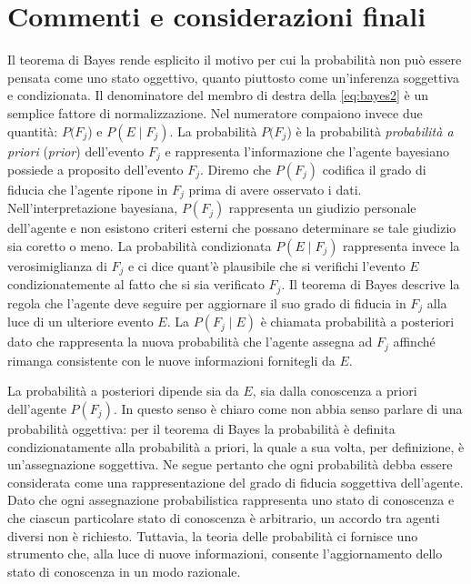 \documentclass[
  11pt,
]{krantz}
\theoremstyle{definition}
\theoremstyle{definition}
\theoremstyle{definition}
\theoremstyle{definition}
\theoremstyle{remark}
\begin{document}
\hypertarget{commenti-e-considerazioni-finali-2}{%
\section*{Commenti e considerazioni finali}\label{commenti-e-considerazioni-finali-2}}


Il teorema di Bayes rende esplicito il motivo per cui la probabilità non può essere pensata come uno stato oggettivo, quanto piuttosto come un'inferenza soggettiva e condizionata. Il denominatore del membro di destra della \eqref{eq:bayes2} è un semplice fattore di normalizzazione. Nel numeratore compaiono invece due quantità: \(P(F_j\)) e \(P(E \mid F_j)\). La probabilità \(P(F_j\)) è la probabilità \emph{probabilità a priori} (\emph{prior}) dell'evento \(F_j\) e rappresenta l'informazione che l'agente bayesiano possiede a proposito dell'evento \(F_j\). Diremo che \(P(F_j)\) codifica il grado di fiducia che l'agente ripone in \(F_j\) prima di avere osservato i dati. Nell'interpretazione bayesiana, \(P(F_j)\) rappresenta un giudizio personale dell'agente e non esistono criteri esterni che possano determinare se tale giudizio sia coretto o meno. La probabilità condizionata \(P(E \mid F_j)\) rappresenta invece la verosimiglianza di \(F_j\) e ci dice quant'è plausibile che si verifichi l'evento \(E\) condizionatemente al fatto che si sia verificato \(F_j\). Il teorema di Bayes descrive la regola che l'agente deve seguire per aggiornare il suo grado di fiducia in \(F_j\) alla luce di un ulteriore evento \(E\). La \(P(F_j \mid E)\) è chiamata probabilità a posteriori dato che rappresenta la nuova probabilità che l'agente assegna ad \(F_j\) affinché rimanga consistente con le nuove informazioni fornitegli da \(E\).

La probabilità a posteriori dipende sia da \(E\), sia dalla conoscenza a priori dell'agente \(P(F_j)\). In questo senso è chiaro come non abbia senso parlare di una probabilità oggettiva: per il teorema di Bayes la probabilità è definita condizionatamente alla probabilità a priori, la quale a sua volta, per definizione, è un'assegnazione soggettiva. Ne segue pertanto che ogni probabilità debba essere considerata come una rappresentazione del grado di fiducia soggettiva dell'agente. Dato che ogni assegnazione probabilistica rappresenta uno stato di conoscenza e che ciascun particolare stato di conoscenza è arbitrario, un accordo tra agenti diversi non è richiesto. Tuttavia, la teoria delle probabilità ci fornisce uno strumento che, alla luce di nuove informazioni, consente l'aggiornamento dello stato di conoscenza in un modo razionale.
\end{document}
